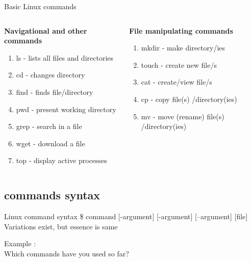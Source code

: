 \documentclass[11pt]{beamer}
\begin{document}
\begin{frame}{Basic Linux commands}

\begin{columns}
\begin{column}{0.5\textwidth}
\large \textbf{Navigational and other commands}
\begin{enumerate}
	\item ls \pause - lists all files and directories
	\item cd \pause - changes directory
	\item find \pause - finds file/directory
	\item pwd \pause - present working directory
	\item grep \pause - search in a file
	\item wget \pause - download a file
	\item top \pause - display active processes
\end{enumerate}
\end{column}
\begin{column}{0.5\textwidth}
\large \textbf{File manipulating commands}
   \begin{enumerate}
	\item mkdir \pause - make directory/ies
	\item touch \pause - create new file/s
	\item cat \pause - create/view file/s
	\item cp \pause - copy file(s) /directory(ies)
	\item mv \pause - move (rename) file(s) /directory(ies)
\end{enumerate}
\end{column}
\end{columns}
\end{frame}

\subsection{commands syntax}
\begin{frame}{Linux command syntax}
\large \$ command [-argument] [-argument] [--argument] [file]\vspace{1cm}\pause \\
Variations exist, but essence is same\vspace{4cm}
 
Example :\\
Which commands have you used so far?
\end{frame}
\end{document}
